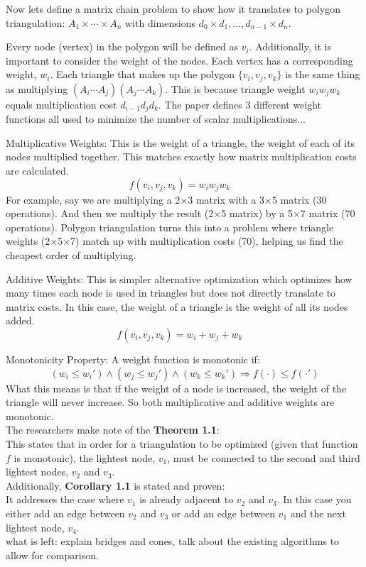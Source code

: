 \documentclass[12pt]{article}
\begin{document}
Now lets define a matrix chain problem to show how it translates to polygon triangulation:  $A_1 \times \cdots \times A_n$ with dimensions $d_0 \times d_1, \ldots, d_{n-1} \times d_n$. 

Every node (vertex) in the polygon will be defined as  $v_i$. Additionally, it is important to consider the weight of the nodes. Each vertex has a corresponding weight, $w_i$. Each triangle that makes up the polygon $\{v_i,v_j,v_k\}$ is the same thing as multiplying $(A_i \cdots A_j)(A_j \cdots A_k)$. This is because triangle weight $w_iw_jw_k$ equals multiplication cost $d_{i-1}d_jd_k$. The paper defines 3 different weight functions all used to minimize the number of scalar multiplications...



Multiplicative Weights: This is the weight of a triangle, the weight of each of its nodes multiplied together. This matches exactly how matrix multiplication costs are calculated.
\begin{equation}
f(v_i,v_j,v_k) = w_iw_jw_k \quad
\end{equation}
For example, say we are multiplying a 2×3 matrix with a 3×5 matrix (30 operations). And then we multiply the result (2×5 matrix) by a 5×7 matrix (70 operations). Polygon triangulation turns this into a problem where triangle weights (2×5×7) match up with multiplication costs (70), helping us find the cheapest order of multiplying.

Additive Weights: This is  simpler alternative optimization which optimizes how many times each node is used in triangles but does not directly translate to matrix costs. In this case, the weight of a triangle is the weight of all its nodes added.
\begin{equation}
f(v_i,v_j,v_k) = w_i + w_j + w_k \quad 
\end{equation}


Monotonicity Property: 
A weight function is monotonic if:
\begin{equation}
(w_i \leq w_i') \land (w_j \leq w_j') \land (w_k \leq w_k') \Rightarrow f(\cdot) \leq f(\cdot')
\end{equation}
What this means is that if the weight of a node is increased, the weight of the triangle will never increase. So both multiplicative and additive weights are monotonic.\\


The researchers make note of the \textbf{Theorem 1.1}: \\
This states that in order for a triangulation to be optimized (given that function $f$ is monotonic), the lightest node, $v_1$, must be connected to the second and third lightest nodes, $v_2$ and $v_3$. \\
Additionally, \textbf{Corollary 1.1} is stated and proven: \\
It addresses the case where $v_1$ is already adjacent to $v_2$ and $v_3$. In this case you either add an edge between $v_2$ and $v_3$ or add an edge between $v_1$ and the next lightest node, $v_4$. \\
 what is left: explain bridges and cones, talk about the existing algorithms to allow for comparison.
\end{document}
